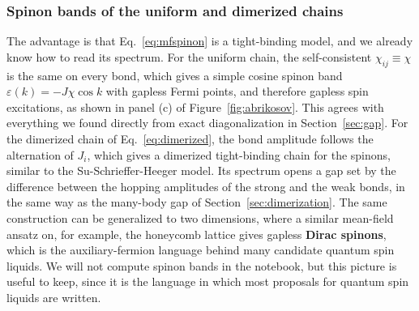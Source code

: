 \documentclass[lecture_notes.tex]{subfiles}
\begin{document}
\subsubsection{Spinon bands of the uniform and dimerized chains}
The advantage is that Eq.~\eqref{eq:mfspinon} is a tight-binding model, and we already know how to
read its spectrum. For the uniform chain, the self-consistent $\chi_{ij}\equiv\chi$ is the same on
every bond, which gives a simple cosine spinon band $\varepsilon(k) = -J\chi\cos k$ with gapless
Fermi points, and therefore gapless spin excitations, as shown in panel (c) of
Figure~\ref{fig:abrikosov}. This agrees with everything we found directly from exact diagonalization
in Section~\ref{sec:gap}. For the dimerized chain of Eq.~\eqref{eq:dimerized}, the bond amplitude
follows the alternation of $J_i$, which gives a dimerized tight-binding chain for the spinons,
similar to the Su-Schrieffer-Heeger model. Its spectrum opens a gap set by the difference between
the hopping amplitudes of the strong and the weak bonds, in the same way as the many-body gap of
Section~\ref{sec:dimerization}. The same construction can be generalized to two dimensions, where a
similar mean-field ansatz on, for example, the honeycomb lattice gives gapless \textbf{Dirac
spinons}, which is the auxiliary-fermion language behind many candidate quantum spin liquids. We
will not compute spinon bands in the notebook, but this picture is useful to keep, since it is the
language in which most proposals for quantum spin liquids are written.
\end{document}
